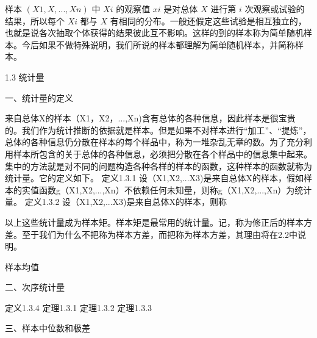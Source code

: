 样本
$(X1,X,...,Xn)$
中
$Xi$
的观察值
$xi$
是对总体
$X$
进行第
$i$
次观察或试验的结果，所以每个
$Xi$
都与
$X$
有相同的分布。一般还假定这些试验是相互独立的，也就是说各次抽取个体获得的结果彼此互不影响。这样的到的样本称为简单随机样本。今后如果不做特殊说明，我们所说的样本都理解为简单随机样本，并简称样本。

1.3 统计量

一、统计量的定义

来自总体X的样本（X1，X2，...,Xn)含有总体的各种信息，因此样本是很宝贵的。我们作为统计推断的依据就是样本。但是如果不对样本进行“加工”、“提炼”，总体的各种信息仍分散在样本的每个样品中，称为一堆杂乱无章的数。为了充分利用样本所包含的关于总体的各种信息，必须把分散在各个样品中的信息集中起来。集中的方法就是对不同的问题构造各种各样的样本的函数，这种样本的函数就称为统计量。它的定义如下。
定义1.3.1
设（X1,X2,...X3)是来自总体X的样本，假如样本的实值函数g（X1,X2,...,Xn）不依赖任何未知量，则称g（X1,X2,...,Xn）为统计量。
定义1.3.2
设（X1,X2,...X3)是来自总体X的样本，则称

以上这些统计量成为样本矩。样本矩是最常用的统计量。记，称为修正后的样本方差。至于我们为什么不把称为样本方差，而把称为样本方差，其理由将在2.2中说明。

样本均值

二、次序统计量

定义1.3.4
定理1.3.1
定理1.3.2
定理1.3.3

三、样本中位数和极差

